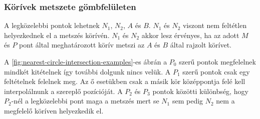 \subsubsection{Körívek metszete gömbfelületen}

A legközelebbi pontok lehetnek $N_1$, $N_2$, $A$ és $B$. $N_1$ és $N_2$ viszont nem feltétlen helyezkednek el a metszés körívén. $N_1$ és $N_2$ akkor lesz érvényes, ha az adott $M$ és $P$ pont által meghatározott körív metszi az $A$ és $B$ által rajzolt körívet.

A \ref{fig:nearest-circle-intersection-examples}-es ábrán a $P_0$ szerű pontok megfelelnek mindkét kitételnek így további dolgunk nincs velük. A $P_1$ szerű pontok csak egy feltételnek felelnek meg. Az ő esetükben csak a másik kör középpontja felé kell interpolálnunk a szereplő pozícióját. A $P_2$ és $P_3$ pontok közötti különbség, hogy $P_2$-nél a legközelebbi pont maga a metszés mert se $N_1$ sem pedig $N_2$ nem a megfelelő köríven helyezkedik el.

